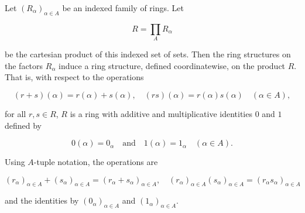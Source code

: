 Let $(R_\alpha)_{\alpha \in A}$ be an indexed family of rings. Let

$$R = \prod_A R_\alpha$$

be the cartesian product of this indexed set of sets. Then the ring structures on the factors $R_\alpha$ induce a ring structure, defined coordinatewise, on the product $R$. That is, with respect to the operations

$$(r + s)(\alpha) = r(\alpha) + s(\alpha), \quad (rs)(\alpha) = r(\alpha)s(\alpha) \quad (\alpha \in A),$$

for all $r, s \in R$, $R$ is a ring with additive and multiplicative identities $0$ and $1$ defined by

$$0(\alpha) = 0_\alpha \quad \text{and} \quad 1(\alpha) = 1_\alpha \quad (\alpha \in A).$$

Using $A$-tuple notation, the operations are

$$(r_\alpha)_{\alpha \in A} + (s_\alpha)_{\alpha \in A} = (r_\alpha + s_\alpha)_{\alpha \in A}, \quad (r_\alpha)_{\alpha \in A}(s_\alpha)_{\alpha \in A} = (r_\alpha s_\alpha)_{\alpha \in A}$$

and the identities by $(0_\alpha)_{\alpha \in A}$ and $(1_\alpha)_{\alpha \in A}$.
